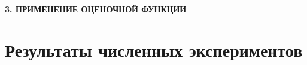 \newpage
\begin{center}
  \textbf{\large 3. ПРИМЕНЕНИЕ ОЦЕНОЧНОЙ ФУНКЦИИ}
\end{center}

\section{Результаты численных экспериментов}